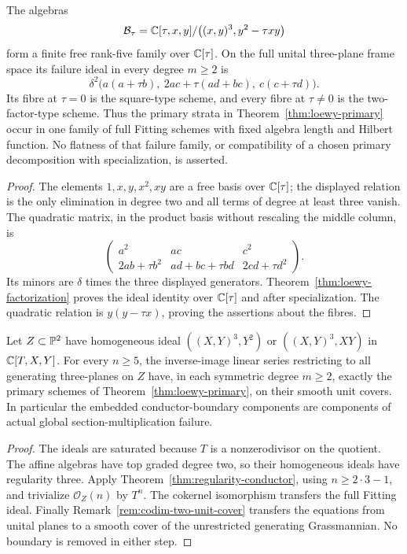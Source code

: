 \begin{proposition}
\label{prop:loewy-collision}
The algebras
\[
 \mathcal B_\tau=\mathbb C[\tau,x,y]/\bigl((x,y)^3,y^2-\tau xy\bigr)
\]
form a finite free rank-five family over $\mathbb C[\tau]$. On the full
unital three-plane frame space its failure ideal in every degree
$m\ge2$ is
\begin{equation}\label{eq:loewy-collision}
 \delta^2\bigl(a(a+\tau b),\
       2ac+\tau(ad+bc),\ c(c+\tau d)\bigr).
\end{equation}
Its fibre at $\tau=0$ is the square-type scheme, and every fibre
at $\tau\ne0$ is the two-factor-type scheme. Thus the primary
strata in Theorem~\ref{thm:loewy-primary} occur in one family of
full Fitting schemes with fixed algebra length and Hilbert function.
No flatness of that failure family, or compatibility of a chosen
primary decomposition with specialization, is asserted.
\end{proposition}
\begin{proof}
The elements $1,x,y,x^2,xy$ are a free basis over $\mathbb C[\tau]$;
the displayed relation is the only elimination in degree two and
all terms of degree at least three vanish. The quadratic matrix,
in the product basis without rescaling the middle column, is
\[
 \begin{pmatrix}
 a^2&ac&c^2\\
 2ab+\tau b^2&ad+bc+\tau bd&2cd+\tau d^2
 \end{pmatrix}.
\]
Its minors are $\delta$ times the three displayed generators.
Theorem~\ref{thm:loewy-factorization} proves the ideal identity over
$\mathbb C[\tau]$ and after specialization. The quadratic relation is
$y(y-\tau x)$, proving the assertions about the fibres.
\end{proof}

\begin{corollary}[Projective realization of the complete boundary]
\label{cor:loewy-global}
Let $Z\subset\mathbb P^2$ have homogeneous ideal
$((X,Y)^3,Y^2)$ or $((X,Y)^3,XY)$ in $\mathbb C[T,X,Y]$.
For every $n\ge5$, the inverse-image linear series restricting to
all generating three-planes on $Z$ have, in each symmetric degree
$m\ge2$, exactly the primary schemes of
Theorem~\ref{thm:loewy-primary}, on their smooth unit covers.
In particular the embedded conductor-boundary components are
components of actual global section-multiplication failure.
\end{corollary}
\begin{proof}
The ideals are saturated because $T$ is a nonzerodivisor on the
quotient. The affine algebras have top graded degree two, so their
homogeneous ideals have regularity three. Apply
Theorem~\ref{thm:regularity-conductor}, using $n\ge2\cdot3-1$,
and trivialize $\mathcal O_Z(n)$ by $T^n$.
The cokernel isomorphism transfers the full Fitting ideal. Finally
Remark~\ref{rem:codim-two-unit-cover} transfers the equations from
unital planes to a smooth cover of the unrestricted generating
Grassmannian. No boundary is removed in either step.
\end{proof}
